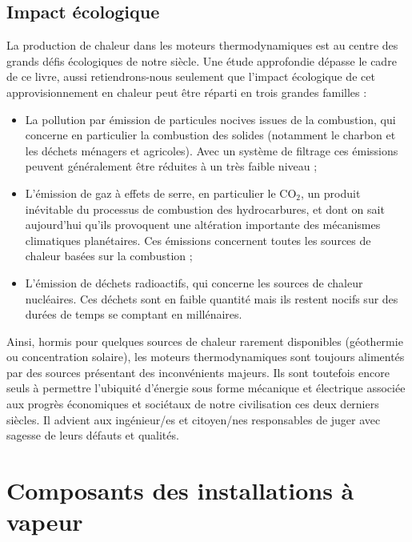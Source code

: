 
	\subsection{Impact écologique}
	
		La production de chaleur dans les moteurs thermodynamiques est au centre des grands défis écologiques de notre siècle. Une étude approfondie dépasse le cadre de ce livre, aussi retiendrons-nous seulement que l’impact écologique de cet approvisionnement en chaleur peut être réparti en trois grandes familles :
		\begin{itemize}
			\item La pollution par émission de particules nocives issues de la combustion, qui concerne en particulier la combustion des solides (notamment le charbon et les déchets ménagers et agricoles). Avec un système de filtrage ces émissions peuvent généralement être réduites à un très faible niveau ;
			\item L’émission de gaz à effets de serre, en particulier le $\text{CO}_2$, un produit inévitable du processus de combustion des hydrocarbures, et dont on sait aujourd’hui qu’ils provoquent une altération importante des mécanismes climatiques planétaires. Ces émissions concernent toutes les sources de chaleur basées sur la combustion ;
			\item L’émission de déchets radioactifs, qui concerne les sources de chaleur nucléaires. Ces déchets sont en faible quantité mais ils restent nocifs sur des durées de temps se comptant en millénaires.
		\end{itemize}

		Ainsi, hormis pour quelques sources de chaleur rarement disponibles (géothermie ou concentration solaire), les moteurs thermodynamiques sont toujours alimentés par des sources présentant des inconvénients majeurs. Ils sont toutefois encore seuls à permettre l’ubiquité d’énergie sous forme mécanique et électrique associée aux progrès économiques et sociétaux de notre civilisation ces deux derniers siècles. Il advient aux ingénieur/es et citoyen/nes responsables de juger avec sagesse de leurs défauts et qualités.


\section{Composants des installations à vapeur}


